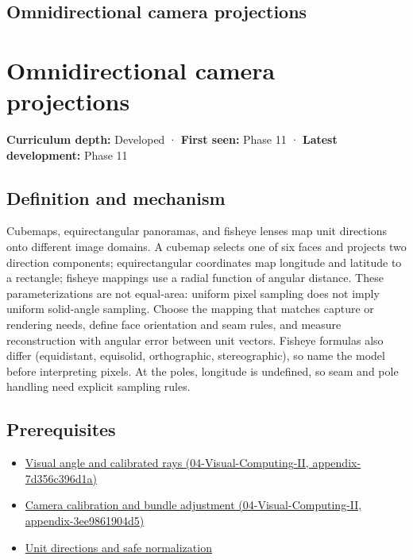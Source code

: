 \hypertarget{appendix-fc99ad39f351}{}
\section*{Omnidirectional camera projections}
\chapter{Omnidirectional camera projections}\label{appendix-fc99ad39f351-omnidirectional-camera-projections}

\textbf{Curriculum depth:} Developed · \textbf{First seen:} Phase 11 · \textbf{Latest development:} Phase 11

\section{Definition and mechanism}\label{appendix-fc99ad39f351-definition-and-mechanism}

Cubemaps, equirectangular panoramas, and fisheye lenses map unit directions onto different image domains. A cubemap selects one of six faces and projects two direction components; equirectangular coordinates map longitude and latitude to a rectangle; fisheye mappings use a radial function of angular distance. These parameterizations are not equal-area: uniform pixel sampling does not imply uniform solid-angle sampling. Choose the mapping that matches capture or rendering needs, define face orientation and seam rules, and measure reconstruction with angular error between unit vectors. Fisheye formulas also differ (equidistant, equisolid, orthographic, stereographic), so name the model before interpreting pixels. At the poles, longitude is undefined, so seam and pole handling need explicit sampling rules.

\section{Prerequisites}\label{appendix-fc99ad39f351-prerequisites}

\begin{itemize}
\tightlist
\item
  \href{../04-Visual-Computing-II/main.pdf\#nameddest=appendix-7d356c396d1a}{Visual angle and calibrated rays (04-Visual-Computing-II, appendix-7d356c396d1a)}
\item
  \href{../04-Visual-Computing-II/main.pdf\#nameddest=appendix-3ee9861904d5}{Camera calibration and bundle adjustment (04-Visual-Computing-II, appendix-3ee9861904d5)}
\item
  \hyperref[appendix-f744e41b95b4]{Unit directions and safe normalization}
\end{itemize}

